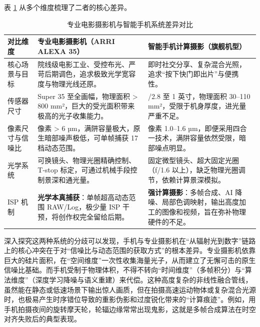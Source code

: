 \documentclass[12pt, a4paper]{ctexart}
\begin{document}
表 \ref{tab:comparison} 从多个维度梳理了二者的核心差异。

\begin{table}[H]
\centering
\caption{专业电影摄影机与智能手机系统差异对比}
\label{tab:comparison}
\renewcommand{\arraystretch}{1.3}
\begin{tabular}{@{} >{\raggedright\arraybackslash}p{2.8cm} >{\raggedright\arraybackslash}p{6cm} >{\raggedright\arraybackslash}p{6cm} @{}}
\toprule
\textbf{对比维度} & \textbf{专业电影摄影机（ARRI ALEXA 35）} & \textbf{智能手机计算摄影（旗舰机型）} \\ \midrule
核心场景与目标 & 
院线级电影工业、受控布光、严苛后期调色，追求极致光学宽容度与物理光线还原。 & 
即时社交分享、复杂混合光照，追求“按下快门即出片”与便携性。 \\ \addlinespace
传感器尺寸 & 
Super 35 至全画幅，物理面积 > 800 mm²，巨大的受光面积带来极高的光子收集能力。 & 
1/2.8 至 1 英寸，物理面积 30–110 mm²，受限于机身厚度，进光量严重不足。 \\ \addlinespace
像素尺寸与信噪比 & 
像素 > 6 µm，满阱容量极大，原生暗部噪声极低，可单帧捕获 17 档动态范围。 & 
像素 1.0–1.6 µm，即便采用四合一技术，满阱容量依然受限，暗部噪点明显。 \\ \addlinespace
光学系统 & 
可换镜头、物理光圈精确控制、T-stop 标定，可通过机械手段控制景深和通光量。 & 
固定微型镜头、超大固定光圈（f/1.6 以上），缺乏物理光圈调节，依赖计算景深模拟。 \\ \addlinespace
ISP 机制 & 
\textbf{光学本真捕获}：单帧超高动态范围 RAW/Log，极少量 ISP 干预，将创作权完全留给后期。 & 
\textbf{强计算摄影}：多帧合成、AI 降噪、局部色调映射，输出高度加工的图像和视频，旨在弥补物理硬件的不足。 \\ \bottomrule
\end{tabular}
\end{table}

深入探究这两种系统的分歧可以发现，手机与专业摄影机在“从辐射光到数字”链路上的核心冲突在于对“信噪比与动态范围的获取方式”的根本差异。专业摄影机依靠巨大的硅片面积，在“空间维度”一次性收集海量光子，从而建立了无懈可击的原生信噪比基础。而手机受制于物理体积，不得不转向“时间维度”（多帧积分）与“算法维度”（深度学习降噪与语义重建）来代偿。这种高度复杂的非线性融合管线，虽然能在静态或低速场景下输出惊人画质，但在拍摄高速运动物体或复杂混合光源时，也极易产生时序错位导致的重影伪影和过度锐化带来的“计算痕迹”。例如，用手机拍摄夜间的旋转摩天轮，轮辐边缘常常出现鬼影，这就是多帧合成算法在时空对齐失败后的典型表现。
\end{document}
